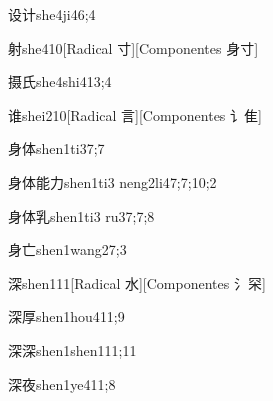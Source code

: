 \begin{verbete}{设计}{she4ji4}{6;4}
\end{verbete}

\begin{verbete}{射}{she4}{10}[Radical 寸][Componentes 身寸]
\end{verbete}

\begin{verbete}{摄氏}{she4shi4}{13;4}
\end{verbete}

\begin{verbete}{谁}{shei2}{10}[Radical 言][Componentes 讠隹]
\end{verbete}

\begin{verbete}{身体}{shen1ti3}{7;7}
\end{verbete}

\begin{verbete}{身体能力}{shen1ti3 neng2li4}{7;7;10;2}
\end{verbete}

\begin{verbete}{身体乳}{shen1ti3 ru3}{7;7;8}
\end{verbete}

\begin{verbete}{身亡}{shen1wang2}{7;3}
\end{verbete}

\begin{verbete}{深}{shen1}{11}[Radical 水][Componentes 氵罙]
\end{verbete}

\begin{verbete}{深厚}{shen1hou4}{11;9}
\end{verbete}

\begin{verbete}{深深}{shen1shen1}{11;11}
\end{verbete}

\begin{verbete}{深夜}{shen1ye4}{11;8}
\end{verbete}

